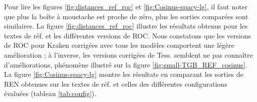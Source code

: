 Pour lire les figures \ref{fig:distances_ref_roc} et \ref{fig:Cosinus-spacy-lg}, il faut noter que plus la boîte à moustache est proche de zéro, plus les sorties comparées sont similaires. La figure \ref{fig:distances_ref_roc} illustre les résultats obtenus pour les textes de réf. et les différentes versions de ROC. Nous constatons que les versions de ROC pour Kraken corrigées avec tous les modèles comportent une légère amélioration ; à l'inverse, les versions corrigées de Tess. semblent ne pas connaître d'améliorations, phénomène illustré sur la figure \ref{fig:small-TGB_REF_cosinus}. 
La figure \ref{fig:Cosinus-spacy-lg} montre les résultats en comparant les sorties de REN obtenues sur les textes de réf. et celles des différentes configurations évaluées (tableau \ref{tab:config}). %
